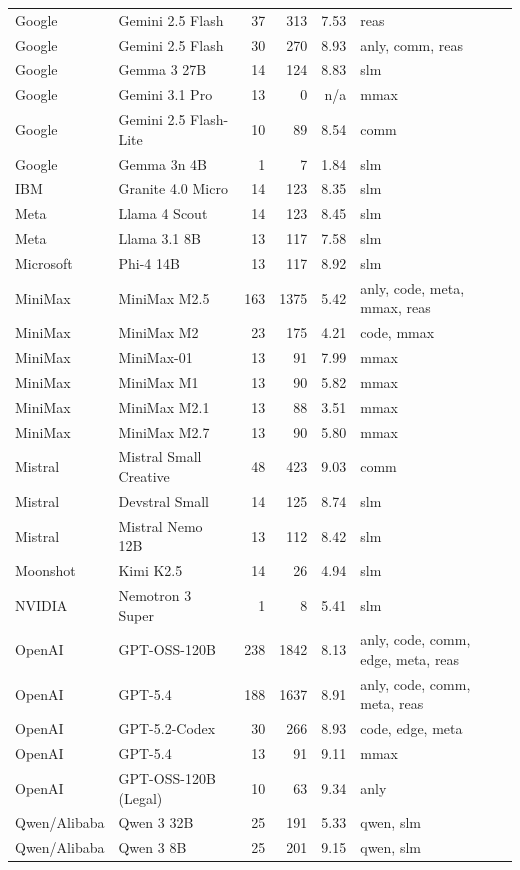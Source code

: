 \begin{longtable}{llrrrp{3.0cm}}
Google & Gemini 2.5 Flash & 37 & 313 & 7.53 & reas \\
Google & Gemini 2.5 Flash & 30 & 270 & 8.93 & anly, comm, reas \\
Google & Gemma 3 27B & 14 & 124 & 8.83 & slm \\
Google & Gemini 3.1 Pro & 13 & 0 & n/a & mmax \\
Google & Gemini 2.5 Flash-Lite & 10 & 89 & 8.54 & comm \\
Google & Gemma 3n 4B & 1 & 7 & 1.84 & slm \\
IBM & Granite 4.0 Micro & 14 & 123 & 8.35 & slm \\
Meta & Llama 4 Scout & 14 & 123 & 8.45 & slm \\
Meta & Llama 3.1 8B & 13 & 117 & 7.58 & slm \\
Microsoft & Phi-4 14B & 13 & 117 & 8.92 & slm \\
MiniMax & MiniMax M2.5 & 163 & 1375 & 5.42 & anly, code, meta, mmax, reas \\
MiniMax & MiniMax M2 & 23 & 175 & 4.21 & code, mmax \\
MiniMax & MiniMax-01 & 13 & 91 & 7.99 & mmax \\
MiniMax & MiniMax M1 & 13 & 90 & 5.82 & mmax \\
MiniMax & MiniMax M2.1 & 13 & 88 & 3.51 & mmax \\
MiniMax & MiniMax M2.7 & 13 & 90 & 5.80 & mmax \\
Mistral & Mistral Small Creative & 48 & 423 & 9.03 & comm \\
Mistral & Devstral Small & 14 & 125 & 8.74 & slm \\
Mistral & Mistral Nemo 12B & 13 & 112 & 8.42 & slm \\
Moonshot & Kimi K2.5 & 14 & 26 & 4.94 & slm \\
NVIDIA & Nemotron 3 Super & 1 & 8 & 5.41 & slm \\
OpenAI & GPT-OSS-120B & 238 & 1842 & 8.13 & anly, code, comm, edge, meta, reas \\
OpenAI & GPT-5.4 & 188 & 1637 & 8.91 & anly, code, comm, meta, reas \\
OpenAI & GPT-5.2-Codex & 30 & 266 & 8.93 & code, edge, meta \\
OpenAI & GPT-5.4 & 13 & 91 & 9.11 & mmax \\
OpenAI & GPT-OSS-120B (Legal) & 10 & 63 & 9.34 & anly \\
Qwen/Alibaba & Qwen 3 32B & 25 & 191 & 5.33 & qwen, slm \\
Qwen/Alibaba & Qwen 3 8B & 25 & 201 & 9.15 & qwen, slm \\

\end{longtable}
